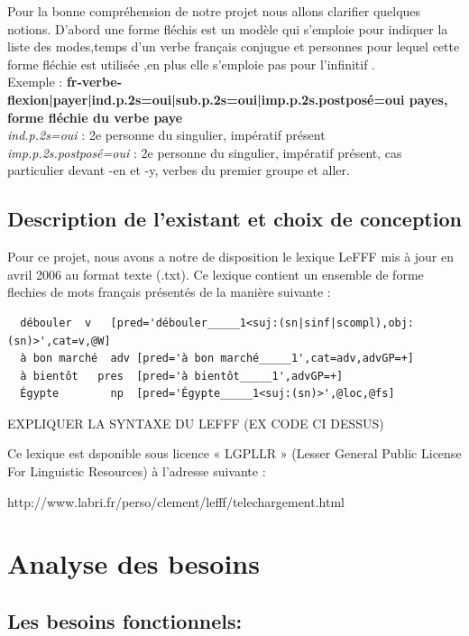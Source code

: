 \documentclass[12pt,a4paper]{article}
\begin{document}
 Pour la bonne compréhension de notre projet nous allons clarifier quelques notions. D'abord une forme fléchis est un modèle qui s'emploie pour indiquer la liste des modes,temps d'un verbe français conjugue et personnes pour lequel cette forme fléchie est utilisée ,en plus elle s'emploie pas pour l'infinitif .
\\ Exemple :
\textbf{{{fr-verbe-flexion|payer|ind.p.2s=oui|sub.p.2s=oui|imp.p.2s.postposé=oui}} payes,  \textbf{forme fléchie} du verbe paye }
\\  \textit{ ind.p.2s=oui} :  2e personne du singulier, impératif présent
\\  \textit{ imp.p.2s.postposé=oui} :   2e personne du singulier, impératif présent, cas particulier devant -en et -y, verbes du premier groupe et aller.




\newpage
\subsection{Description de l'existant et choix de conception}

Pour ce projet, nous avons a notre de disposition le lexique LeFFF mis à jour en avril 2006 au format texte (.txt).
Ce lexique contient un ensemble de forme flechies de mots français présentés de la manière suivante :
\begin{verbatim}
  débouler	v	[pred='débouler_____1<suj:(sn|sinf|scompl),obj:(sn)>',cat=v,@W]
  à bon marché	adv	[pred='à bon marché_____1',cat=adv,advGP=+]
  à bientôt	  pres	[pred='à bientôt_____1',advGP=+]
  Égypte		np	[pred='Égypte_____1<suj:(sn)>',@loc,@fs]
\end{verbatim}

EXPLIQUER LA SYNTAXE DU LEFFF (EX CODE CI DESSUS)

Ce lexique est dsponible sous licence « LGPLLR » (Lesser General Public License For Linguistic Resources) à l'adresse suivante : 
\\ \begin{center}http://www.labri.fr/perso/clement/lefff/telechargement.html\end{center}

  \section{Analyse des besoins}

\subsection{Les besoins fonctionnels:}
\end{document}
